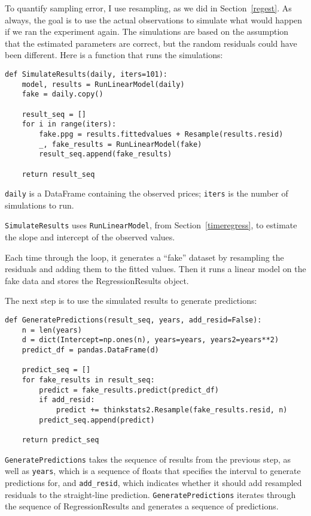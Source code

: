 To quantify sampling error, I use resampling, as we did in
Section~\ref{regest}.  As always, the goal is to use the actual
observations to simulate what would happen if we ran the experiment
again.  The simulations are based on the assumption that the estimated
parameters are correct, but the random residuals could have been
different.  Here is a function that runs the simulations:

\begin{verbatim}
def SimulateResults(daily, iters=101):
    model, results = RunLinearModel(daily)
    fake = daily.copy()
    
    result_seq = []
    for i in range(iters):
        fake.ppg = results.fittedvalues + Resample(results.resid)
        _, fake_results = RunLinearModel(fake)
        result_seq.append(fake_results)

    return result_seq
\end{verbatim}

{\tt daily} is a DataFrame containing the observed prices;
{\tt iters} is the number of simulations to run.

{\tt SimulateResults} uses {\tt RunLinearModel}, from
Section~\ref{timeregress}, to estimate the slope and intercept
of the observed values.

Each time through the loop, it generates a ``fake'' dataset by
resampling the residuals and adding them to the fitted values.  Then
it runs a linear model on the fake data and stores the RegressionResults
object.

The next step is to use the simulated results to generate predictions:

\begin{verbatim}
def GeneratePredictions(result_seq, years, add_resid=False):
    n = len(years)
    d = dict(Intercept=np.ones(n), years=years, years2=years**2)
    predict_df = pandas.DataFrame(d)
    
    predict_seq = []
    for fake_results in result_seq:
        predict = fake_results.predict(predict_df)
        if add_resid:
            predict += thinkstats2.Resample(fake_results.resid, n)
        predict_seq.append(predict)

    return predict_seq
\end{verbatim}

{\tt GeneratePredictions} takes the sequence of results from the
previous step, as well as {\tt years}, which is a sequence of
floats that specifies the interval to generate predictions for,
and \verb"add_resid", which indicates whether it should add resampled
residuals to the straight-line prediction.
{\tt GeneratePredictions} iterates through the sequence of
RegressionResults and generates a sequence of predictions.

